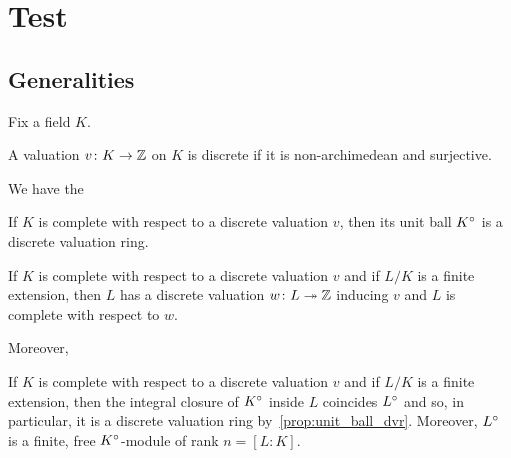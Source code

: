 %

\chapter{Test}

\section{Generalities}
Fix a field $K$.
\begin{def}
	\label{def:discrete-val}
	\leanok
	A valuation $v\colon K \to \mathbb{Z}$ on $K$ is discrete if it is non-archimedean and surjective.
\end{def}

We have the

\begin{proposition}
	\label{prop:unit_ball_dvr}
	If $K$ is complete with respect to a discrete valuation $v$, then its unit ball ${K}^\circ$ is a discrete valuation ring.
\end{proposition}

\begin{lemma} 
	\label{lemma:val_L}
	If $K$ is complete with respect to a discrete valuation $v$ and if $L/K$ is a finite extension, then $L$ has a discrete valuation $w\colon L \twoheadrightarrow \mathbb{Z}$ inducing $v$ and $L$ is complete with respect to $w$.
\end{lemma}

Moreover,
\begin{proposition}
	\label{prop:unitball-L}
	If $K$ is complete with respect to a discrete valuation $v$ and if $L/K$ is a finite extension, then the integral closure of ${K}^\circ$ inside $L$ coincides ${L}^\circ$ and so, in particular, it is a discrete valuation ring by~\ref{prop:unit_ball_dvr}. Moreover, ${L}^\circ$ is a finite, free ${K}^\circ$-module of rank $n=[L:K]$.
\end{proposition}
